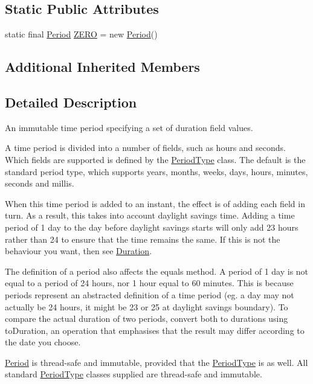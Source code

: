 \subsection*{Static Public Attributes}
\begin{DoxyCompactItemize}
\item 
static final \hyperlink{classorg_1_1joda_1_1time_1_1_period}{Period} \hyperlink{classorg_1_1joda_1_1time_1_1_period_a92cbeef5e75f620641efa710b2bc59f5}{Z\-E\-R\-O} = new \hyperlink{classorg_1_1joda_1_1time_1_1_period}{Period}()
\end{DoxyCompactItemize}
\subsection*{Additional Inherited Members}


\subsection{Detailed Description}
An immutable time period specifying a set of duration field values. 

A time period is divided into a number of fields, such as hours and seconds. Which fields are supported is defined by the \hyperlink{classorg_1_1joda_1_1time_1_1_period_type}{Period\-Type} class. The default is the standard period type, which supports years, months, weeks, days, hours, minutes, seconds and millis. 

When this time period is added to an instant, the effect is of adding each field in turn. As a result, this takes into account daylight savings time. Adding a time period of 1 day to the day before daylight savings starts will only add 23 hours rather than 24 to ensure that the time remains the same. If this is not the behaviour you want, then see \hyperlink{classorg_1_1joda_1_1time_1_1_duration}{Duration}. 

The definition of a period also affects the equals method. A period of 1 day is not equal to a period of 24 hours, nor 1 hour equal to 60 minutes. This is because periods represent an abstracted definition of a time period (eg. a day may not actually be 24 hours, it might be 23 or 25 at daylight savings boundary). To compare the actual duration of two periods, convert both to durations using to\-Duration, an operation that emphasises that the result may differ according to the date you choose. 

\hyperlink{classorg_1_1joda_1_1time_1_1_period}{Period} is thread-\/safe and immutable, provided that the \hyperlink{classorg_1_1joda_1_1time_1_1_period_type}{Period\-Type} is as well. All standard \hyperlink{classorg_1_1joda_1_1time_1_1_period_type}{Period\-Type} classes supplied are thread-\/safe and immutable.

